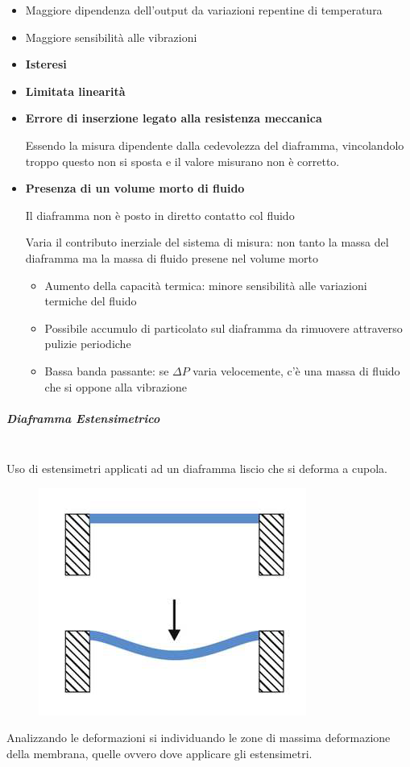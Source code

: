 \documentclass[a4paper, 15pt]{article}
\newcommand{\cmark}{\ding{51}}
\newcommand{\xmark}{\ding{55}}
\begin{document}
\begin{adjustwidth}{2in}{}
\begin{itemize}[label=\textcolor{green}{\cmark}]
\begin{itemize}[label=\textcolor{red}{\xmark}]
  				\item Maggiore dipendenza dell'output da variazioni repentine di temperatura 
  				\item Maggiore sensibilità alle vibrazioni 
  			\end{itemize}
  		\end{itemize}		
 		\begin{itemize}[label=\textcolor{red}{\xmark}]
 			\item \textbf{Isteresi}
 			\item \textbf{Limitata linearità}
 			\item \textbf{Errore di inserzione legato alla resistenza meccanica}
 			
 			Essendo la misura dipendente dalla cedevolezza del diaframma, vincolandolo troppo questo non si sposta e il valore misurano non è corretto. 
 			\item \textbf{Presenza di un volume morto di fluido}
 			
 			Il diaframma non è posto in diretto contatto col fluido
 			
 			Varia il contributo inerziale del sistema di misura: non tanto la massa del diaframma ma la massa di fluido presene nel volume morto
 			\begin{itemize}[label=\textcolor{green}{\cmark}]
 				\item Aumento della capacità termica: minore sensibilità alle variazioni termiche del fluido
 			\end{itemize}
 			\begin{itemize}[label=\textcolor{red}{\xmark}]
 				\item Possibile accumulo di particolato sul diaframma da rimuovere attraverso pulizie periodiche
 				\item Bassa banda passante: se $\Delta P$ varia velocemente, c'è una massa di fluido che si oppone alla vibrazione 
 			\end{itemize}
 		\end{itemize}
\newpage  		
\subparagraph{Diaframma Estensimetrico} \mbox{} \\ 		
 		Uso di estensimetri applicati ad un diaframma liscio che si deforma a cupola. 
 		\begin{figure}[H]
 			\centering
 			\includegraphics[width=0.3\linewidth]{immagini/manometro11}
 			\label{fig:manometro11}
 		\end{figure} 		
 		Analizzando le deformazioni si individuando le zone di massima deformazione della membrana, quelle ovvero dove applicare gli estensimetri.
 		

\end{adjustwidth}
\end{document}
